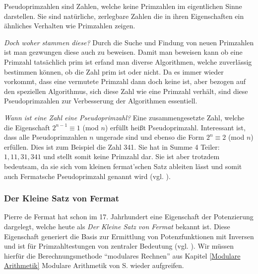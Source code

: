 \documentclass[12pt,a4paper]{article}
\theoremstyle{definition}
\begin{document}
Pseudoprimzahlen sind Zahlen, welche keine Primzahlen im eigentlichen Sinne darstellen.
Sie sind natürliche, zerlegbare Zahlen die in ihren Eigenschaften ein ähnliches Verhalten wie Primzahlen zeigen.

\textit{Doch woher stammen diese?}\newline
Durch die Suche und Findung von neuen Primzahlen ist man gezwungen diese auch zu beweisen.
Damit man beweisen kann ob eine Primzahl tatsächlich prim ist erfand man diverse Algorithmen, welche zuverlässig bestimmen können, ob die Zahl prim ist oder nicht.
Da es immer wieder vorkommt, dass eine vermutete Primzahl dann doch keine ist, aber bezogen auf den speziellen Algorithmus, sich diese Zahl wie eine Primzahl verhält, sind diese Pseudoprimzahlen zur Verbesserung der Algorithmen essentiell.

\textit{Wann ist eine Zahl eine Pseudoprimzahl?}\newline
Eine zusammengesetzte Zahl, welche die Eigenschaft $2^{n-1}\equiv 1$ (mod $n$) erfüllt heißt Pseudoprimzahl.
Interessant ist, dass alle Pseudoprimzahlen $n$ ungerade sind und ebenso die Form $2^n \equiv 2$ (mod $n$) erfüllen.
Dies ist zum Beispiel die Zahl 341.
Sie hat in Summe 4 Teiler: $1, 11, 31, 341$ und stellt somit keine Primzahl dar.
Sie ist aber trotzdem bedeutsam, da sie sich vom kleinen fermat'schen Satz ableiten lässt und somit auch Fermatsche Pseudoprimzahl genannt wird (vgl. \cite[91]{Ribenboim2006}).

\subsubsection{Der Kleine Satz von Fermat}\label{Der Kleine Satz von Fermat}
Pierre de Fermat hat schon im 17. Jahrhundert eine Eigenschaft der Potenzierung dargelegt, welche heute als \textit{Der Kleine Satz von Fermat} bekannt ist.
Diese Eigenschaft generiert die Basis zur Ermittlung von Potenzfunktionen mit Inversen und ist für Primzahltestungen von zentraler Bedeutung (vgl. \cite[303]{Meinel2015}).
Wir müssen hierfür die Berechnungsmethode “modulares Rechnen” aus Kapitel \ref{Modulare Arithmetik} Modulare Arithmetik von S. \pageref{Modulare Arithmetik} wieder aufgreifen.
\end{document}

